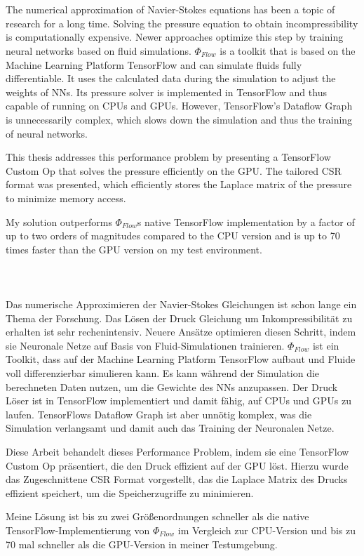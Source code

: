 \chapter{\abstractname}
\small
The numerical approximation of Navier-Stokes equations has been a topic of research for a long time. Solving the pressure equation to obtain incompressibility is computationally expensive. Newer approaches optimize this step by training neural networks based on fluid simulations. $\Phi_{Flow}$ is a toolkit that is based on the Machine Learning Platform TensorFlow and can simulate fluids fully differentiable. It uses the calculated data during the simulation to adjust the weights of NNs. Its pressure solver is implemented in TensorFlow and thus capable of running on CPUs and GPUs. However, TensorFlow's Dataflow Graph is unnecessarily complex, which slows down the simulation and thus the training of neural networks. 
\par This thesis addresses this performance problem by presenting a TensorFlow Custom Op that solves the pressure efficiently on the GPU. The tailored CSR format was presented, which efficiently stores the Laplace matrix of the pressure to minimize memory access. 
\par My solution outperforms $\Phi_{Flow}$s native TensorFlow implementation by a factor of up to two orders of magnitudes compared to the CPU version and is up to 70 times faster than the GPU version on my test environment.\\\\\\\\
Das numerische Approximieren der Navier-Stokes Gleichungen ist schon lange ein Thema der Forschung. Das Lösen der Druck Gleichung um Inkompressibilität zu erhalten ist sehr rechenintensiv. Neuere Ansätze optimieren diesen Schritt, indem sie Neuronale Netze auf Basis von Fluid-Simulationen trainieren. $\Phi_{Flow}$ ist ein Toolkit, dass auf der Machine Learning Platform TensorFlow aufbaut und Fluide voll differenzierbar simulieren kann. Es kann während der Simulation die berechneten Daten nutzen, um die Gewichte des NNs anzupassen. Der Druck Löser ist in TensorFlow implementiert und damit fähig, auf CPUs und GPUs zu laufen. TensorFlows Dataflow Graph ist aber unnötig komplex, was die Simulation verlangsamt und damit auch das Training der Neuronalen Netze. 
\par Diese Arbeit behandelt dieses Performance Problem, indem sie eine TensorFlow Custom Op präsentiert, die den Druck effizient auf der GPU löst. Hierzu wurde das Zugeschnittene CSR Format vorgestellt, das die Laplace Matrix des Drucks effizient speichert, um die Speicherzugriffe zu minimieren. 
\par Meine Lösung ist bis zu zwei Größenordnungen schneller als die native TensorFlow-Implementierung von $\Phi_{Flow}$ im Vergleich zur CPU-Version und bis zu 70 mal schneller als die GPU-Version in meiner Testumgebung.

\normalsize